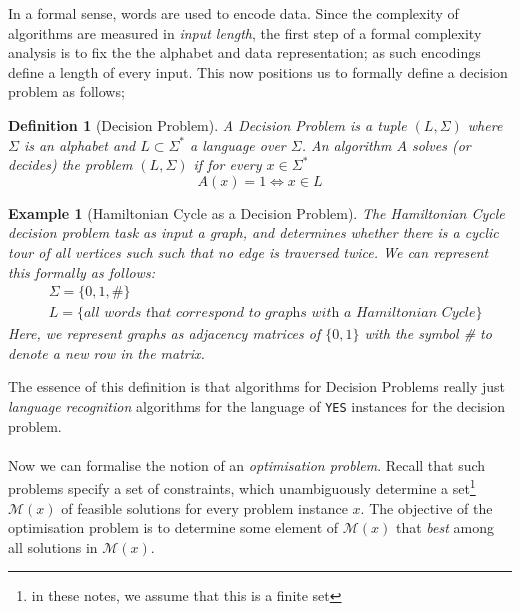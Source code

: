 \documentclass[a4paper,10pt]{article}
\newtheorem{definition}{Definition}
\newtheorem{example}{Example}
\begin{document}
In a formal sense, words are used to encode data. Since the complexity of algorithms are measured in \textit{input length}, the first step of a formal complexity analysis is to fix the the alphabet and data representation; as such encodings define a length of every input. This now positions us to formally define a decision problem as follows; 

\begin{definition}[Decision Problem]
    A Decision Problem is a tuple $(L,\Sigma)$ where $\Sigma$ is an alphabet and $L\subset\Sigma^*$ a language over $\Sigma$. An algorithm $A$ solves (or decides) the problem $(L,\Sigma)$ if for every $x\in\Sigma^*$ 
        $$A(x) = 1 \iff x\in L$$
\end{definition}

\begin{example}[Hamiltonian Cycle as a Decision Problem]
    The Hamiltonian Cycle decision problem task as input a graph, and determines whether there is a cyclic tour of all vertices such such that no edge is traversed twice. We can represent this formally as follows:
    \begin{align*}
        & \Sigma = \{0,1,\#\} \\
        & L = \{\textit{all words that correspond to graphs with a Hamiltonian Cycle}\}
    \end{align*}
    Here, we represent graphs as adjacency matrices of $\{0,1\}$ with the symbol \# to denote a new row in the matrix.
\end{example}

The essence of this definition is that algorithms for Decision Problems really just \textit{language recognition} algorithms for the language of \texttt{YES} instances for the decision problem. \\
\\
Now we can formalise the notion of an \textit{optimisation problem}. Recall that such problems specify a set of constraints, which unambiguously determine a set\footnote{in these notes, we assume that this is a finite set} $\mathcal{M}(x)$ of feasible solutions for every problem instance $x$. The objective of the optimisation problem is to determine some element of $\mathcal{M}(x)$ that \textit{best} among all solutions in $\mathcal{M}(x)$.
\end{document}
